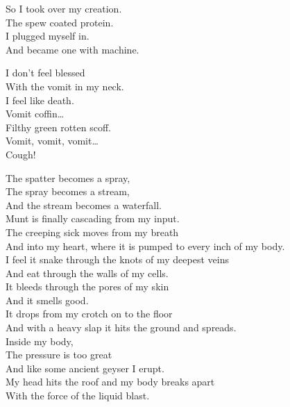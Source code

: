 So I took over my creation. \\
The spew coated protein. \\
I plugged myself in. \\
And became one with machine. \\


I don't feel blessed \\
With the vomit in my neck. \\
I feel like death. \\

Vomit coffin… \\

Filthy green rotten scoff. \\
Vomit, vomit, vomit… \\
Cough! \\





The spatter becomes a spray, \\
The spray becomes a stream, \\
And the stream becomes a waterfall. \\
Munt is finally cascading from my input. \\

The creeping sick moves from my breath \\
And into my heart, where it is pumped to every inch of my body. \\
I feel it snake through the knots of my deepest veins \\
And eat through the walls of my cells. \\

It bleeds through the pores of my skin \\
And it smells good. \\
It drops from my crotch on to the floor \\
And with a heavy slap it hits the ground and spreads. \\

Inside my body, \\
The pressure is too great \\
And like some ancient geyser I erupt. \\
My head hits the roof and my body breaks apart \\
With the force of the liquid blast. \\

